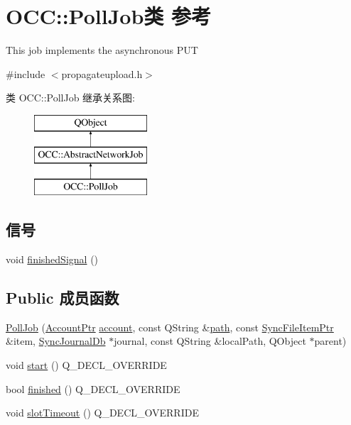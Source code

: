 \hypertarget{class_o_c_c_1_1_poll_job}{}\section{O\+CC\+:\+:Poll\+Job类 参考}
\label{class_o_c_c_1_1_poll_job}


This job implements the asynchronous P\+UT  




{\ttfamily \#include $<$propagateupload.\+h$>$}

类 O\+CC\+:\+:Poll\+Job 继承关系图\+:\begin{figure}[H]
\begin{center}
\leavevmode
\includegraphics[height=3.000000cm]{class_o_c_c_1_1_poll_job}
\end{center}
\end{figure}
\subsection*{信号}
\begin{DoxyCompactItemize}
\item 
void \hyperlink{class_o_c_c_1_1_poll_job_a0a0f03597b751b591bbadba48c5a738e}{finished\+Signal} ()
\end{DoxyCompactItemize}
\subsection*{Public 成员函数}
\begin{DoxyCompactItemize}
\item 
\hyperlink{class_o_c_c_1_1_poll_job_adca9f0109f3ecec23b7abd3af0d1d290}{Poll\+Job} (\hyperlink{namespace_o_c_c_a848616aedb9188e223c6b9867757fe69}{Account\+Ptr} \hyperlink{class_o_c_c_1_1_abstract_network_job_a469c9d8212a338ad07d1efa1a94f784d}{account}, const Q\+String \&\hyperlink{class_o_c_c_1_1_abstract_network_job_a8ed2423a454ec861c20f6900f5591ef7}{path}, const \hyperlink{namespace_o_c_c_acb6b0db82893659fbd0c98d3c5b8e2b8}{Sync\+File\+Item\+Ptr} \&item, \hyperlink{class_o_c_c_1_1_sync_journal_db}{Sync\+Journal\+Db} $\ast$journal, const Q\+String \&local\+Path, Q\+Object $\ast$parent)
\item 
void \hyperlink{class_o_c_c_1_1_poll_job_a5d11e738f6759ecce57ebeb79cd5c9ac}{start} () Q\+\_\+\+D\+E\+C\+L\+\_\+\+O\+V\+E\+R\+R\+I\+DE
\item 
bool \hyperlink{class_o_c_c_1_1_poll_job_a06b39d3adf1ff0cccadfc3ca74be81d0}{finished} () Q\+\_\+\+D\+E\+C\+L\+\_\+\+O\+V\+E\+R\+R\+I\+DE
\item 
void \hyperlink{class_o_c_c_1_1_poll_job_a0dea33409ec87632839862ef1c228fd6}{slot\+Timeout} () Q\+\_\+\+D\+E\+C\+L\+\_\+\+O\+V\+E\+R\+R\+I\+DE
\end{DoxyCompactItemize}
